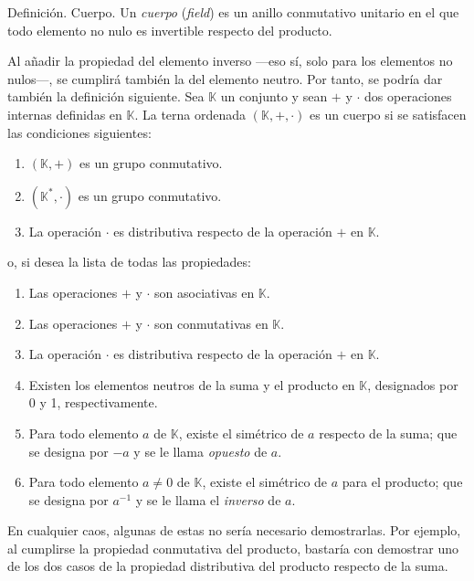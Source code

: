 


Definición. Cuerpo. Un \emph{cuerpo} (\emph{field}) es un anillo conmutativo
unitario en el que todo elemento no nulo es invertible respecto del
producto.

Al añadir la propiedad del elemento inverso ---eso sí, solo para los
elementos no nulos---, se cumplirá también la del elemento neutro. Por
tanto, se podría dar también la definición siguiente. Sea $\mathbb{K}$ un
conjunto y sean $+$ y $\cdot$ dos operaciones internas definidas en
$\mathbb{K}$. La terna ordenada $(\mathbb{K}, +, \cdot)$ es un cuerpo si se
satisfacen las condiciones siguientes:

\begin{enumerate}
  \item $(\mathbb{K}, +)$ es un grupo conmutativo.
  \item $(\mathbb{K}^*, \cdot)$ es un grupo conmutativo.
  \item La operación $\cdot$ es distributiva respecto de la operación $+$ en
    $\mathbb{K}$.
\end{enumerate}

\noindent o, si desea la lista de todas las propiedades:

\begin{enumerate}
  \item Las operaciones $+$ y $\cdot$ son asociativas en $\mathbb{K}$.
  \item Las operaciones $+$ y $\cdot$ son conmutativas en $\mathbb{K}$.
  \item La operación $\cdot$ es distributiva respecto de la operación $+$ en
    $\mathbb{K}$.
  \item Existen los elementos neutros de la suma y el producto en
    $\mathbb{K}$, designados por 0 y 1, respectivamente.
  \item Para todo elemento $a$ de $\mathbb{K}$, existe el simétrico de $a$
    respecto de la suma; que se designa por ${-a}$ y se le llama
    \emph{opuesto} de $a$.
  \item Para todo elemento $a \neq 0$ de $\mathbb{K}$, existe el simétrico
    de $a$ para el producto; que se designa por $a^{-1}$ y se le llama el
    \emph{inverso} de $a$.
\end{enumerate}

En cualquier caos, algunas de estas no sería necesario demostrarlas. Por
ejemplo, al cumplirse la propiedad conmutativa del producto, bastaría con
demostrar uno de los dos casos de la propiedad distributiva del producto
respecto de la suma.

